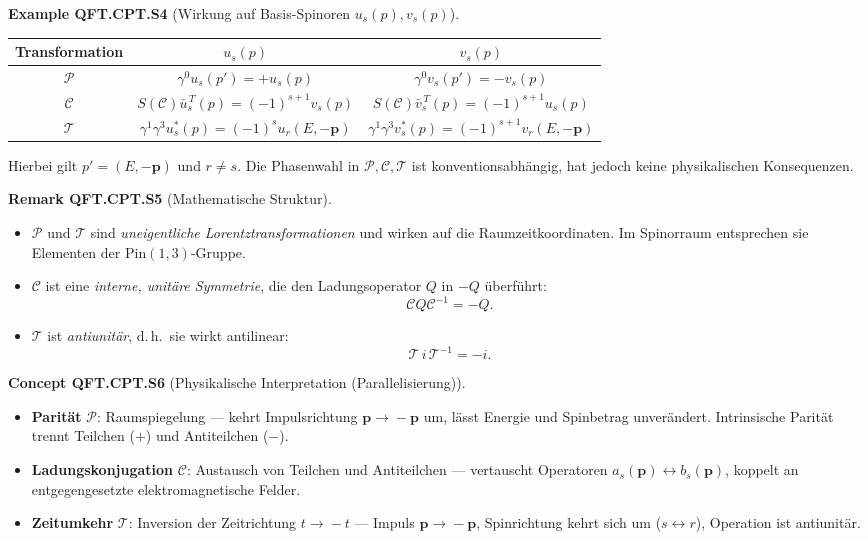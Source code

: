 \documentclass[10pt, letterpaper]{article}
\newcommand{\Pin}{\mathrm{Pin}}
\newcommand{\CustomHeading}[3]{%
  \par\medskip\noindent%
  \textbf{#1 #2} \textnormal{(#3)}.\enskip%
}
\newenvironment{REM}[2]{\begin{unitbox}\CustomHeading{Remark}{#1}{#2}}{\end{unitbox}}
\newenvironment{EXA}[2]{\begin{unitbox}\CustomHeading{Example}{#1}{#2}}{\end{unitbox}}
\newenvironment{CONC}[2]{\begin{unitbox}\CustomHeading{Concept}{#1}{#2}}{\end{unitbox}}
\begin{document}
\begin{EXA}{QFT.CPT.S4}{Wirkung auf Basis-Spinoren $u_s(p),v_s(p)$}
\renewcommand{\arraystretch}{1.5}
\begin{center}
\begin{tabular}{|c|c|c|}
\hline
Transformation & $u_s(p)$ & $v_s(p)$ \\ \hline
$\mathcal P$ &
$\gamma^0u_s(p')=+u_s(p)$ &
$\gamma^0v_s(p')=-v_s(p)$ \\ \hline
$\mathcal C$ &
$S(\mathcal C)\bar u_s^{\,T}(p)=(-1)^{s+1}v_s(p)$ &
$S(\mathcal C)\bar v_s^{\,T}(p)=(-1)^{s+1}u_s(p)$ \\ \hline
$\mathcal T$ &
$\gamma^1\gamma^3u_s^*(p)=(-1)^s u_r(E,-\mathbf p)$ &
$\gamma^1\gamma^3v_s^*(p)=(-1)^{s+1} v_r(E,-\mathbf p)$ \\ \hline
\end{tabular}
\end{center}

\noindent
Hierbei gilt $p'=(E,-\mathbf p)$ und $r\neq s$.  
Die Phasenwahl in $\mathcal P,\mathcal C,\mathcal T$ ist konventionsabhängig, hat jedoch keine physikalischen Konsequenzen.
\end{EXA}

\begin{REM}{QFT.CPT.S5}{Mathematische Struktur}
\begin{itemize}
  \item $\mathcal P$ und $\mathcal T$ sind \emph{uneigentliche Lorentztransformationen} und wirken auf die Raumzeitkoordinaten.  
  Im Spinorraum entsprechen sie Elementen der $\Pin(1,3)$-Gruppe.
  \item $\mathcal C$ ist eine \emph{interne, unitäre Symmetrie}, die den Ladungsoperator $Q$ in $-Q$ überführt:
  \[
  \mathcal C Q \mathcal C^{-1} = -Q.
  \]
  \item $\mathcal T$ ist \emph{antiunitär}, d.\,h.\ sie wirkt antilinear:
  \[
  \mathcal T\,i\,\mathcal T^{-1}=-i.
  \]
\end{itemize}
\end{REM}

\begin{CONC}{QFT.CPT.S6}{Physikalische Interpretation (Parallelisierung)}
\begin{itemize}
  \item \textbf{Parität} $\mathcal P$: Raumspiegelung — kehrt Impulsrichtung $\mathbf p\!\to\!-\mathbf p$ um, lässt Energie und Spinbetrag unverändert.  
    Intrinsische Parität trennt Teilchen ($+$) und Antiteilchen ($-$).
  \item \textbf{Ladungskonjugation} $\mathcal C$: Austausch von Teilchen und Antiteilchen — vertauscht Operatoren $a_s(\mathbf p)\leftrightarrow b_s(\mathbf p)$, koppelt an entgegengesetzte elektromagnetische Felder.
  \item \textbf{Zeitumkehr} $\mathcal T$: Inversion der Zeitrichtung $t\!\to\!-t$ — Impuls $\mathbf p\!\to\!-\mathbf p$, Spinrichtung kehrt sich um ($s\leftrightarrow r$), Operation ist antiunitär.
\end{itemize}
\end{CONC}
\end{document}

